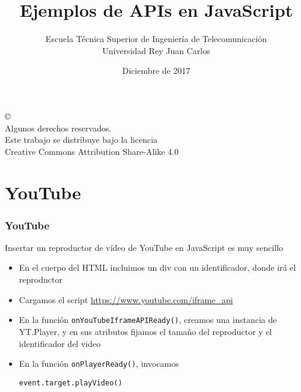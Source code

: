 \documentclass[ucs]{beamer}
\begin{document}
\title[Ejemplos de APIs]{Ejemplos de APIs en JavaScript}
\author[GSyC]{Escuela Técnica Superior de Ingeniería de Telecomunicación\\
Universidad Rey Juan Carlos}
\date[2017]{Diciembre de 2017}


\begin{frame}
  \titlepage
\end{frame}




\begin{frame}[b]
\begin{flushright}
{\tiny
\copyright \insertshortdate~\insertshortauthor \\
  Algunos derechos reservados. \\
  Este trabajo se distribuye bajo la licencia \\
  Creative Commons Attribution Share-Alike 4.0
}
\end{flushright}
\end{frame}



%

\section{YouTube}


\begin{frame}[fragile]
\frametitle{YouTube}
Insertar un reproductor de vídeo de YouTube en JavaScript es muy sencillo

\begin{itemize}
\item
En el cuerpo del HTML incluimos un div con un identificador, donde irá el reproductor

\item
Cargamos el script
\url{https://www.youtube.com/iframe_api}

\item
En la función
\verb|onYouTubeIframeAPIReady()|,
creamos una instancia de YT.Player, y en sus atributos
fijamos el tamaño del reproductor y el identificador del video

\item
En la función
\verb|onPlayerReady()|,
invocamos 

\verb|event.target.playVideo()|
\end{itemize}
\end{frame}
\end{document}
